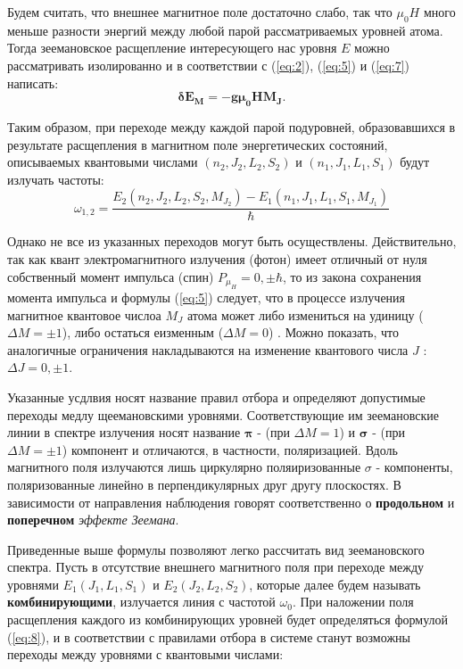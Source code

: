 Будем считать, что внешнее магнитное поле достаточно слабо, так что $\mu_0 H$ много меньше разности энергий между любой парой  рассматриваемых уровней атома. Тогда зеемановское расщепление интересующего нас уровня $E$ можно рассматривать изолированно и в соответствии с (\ref{eq:2}), (\ref{eq:5}) и (\ref{eq:7}) написать: 
\begin{equation}
\mathbf{\delta E_{M} = - g \mu_{0} H M_J}.
\label{eq:8} 
\end{equation}  

Таким образом, при переходе между каждой парой подуровней, образовавшихся в результате расщепления в магнитном поле энергетических состояний, описываемых квантовыми числами $(n_{2},J_{2},L_{2},S_{2})$ и $(n_{1},J_{1},L_{1},S_{1})$  будут излучать частоты: 
\begin{equation}
\omega_{1,2} = \frac{E_{2}(n_{2},J_{2},L_{2},S_{2},M_{J_{2}})-E_{1}(n_{1},J_{1},L_{1},S_{1},M_{J_1})}{\hbar}
\label{eq:9} 
\end{equation}


Однако не все из указанных переходов могут быть осуществлены. Действительно, так как квант электромагнитного излучения (фотон) имеет отличный от нуля собственный момент импульса (спин) $P_{\mu_H} = {0,\pm\hbar}$, то из закона сохранения момента импульса и формулы (\ref{eq:5}) следует, что в процессе излучения магнитное квантовое числоа $M_J$ атома  может либо измениться на удиницу ($\Delta M=\pm 1$),  либо остаться еизменным ($\Delta M = 0$) . Можно показать, что аналогичные ограничения накладываются на изменение квантового числа $J$ : $\Delta J = {0,\pm 1}$.

Указанные усдлвия носят название правил отбора и определяют допустимые переходы медлу щеемановскими уровнями. Соответствующие им зеемановские линии в спектре излучения носят название $\mathbf{\pi}$ - (при $\Delta M = 1$) и $\mathbf{\sigma }$ - (при $\Delta M= \pm 1$)  компонент и отличаются, в частности, поляризацией. Вдоль магнитного поля излучаются лишь циркулярно поляиризованные $\sigma$ - компоненты,  поляризованные линейно в перпендикулярных друг другу плоскостях. В зависимости от направления наблюдения говорят соответственно о \textbf{продольном} и \textbf{поперечном} \textit{эффекте Зеемана}. 

Приведенные выше формулы позволяют легко рассчитать вид зеемановского спектра. Пусть в отсутствие внешнего магнитного поля при переходе между уровнями $E_{1}(J_{1},L_{1},S_{1})$ и $E_{2}(J_{2},L_{2},S_{2})$, которые далее будем называть \textbf{комбинирующими}, излучается линия с частотой $\omega_0$. При наложении поля расщепления каждого из комбинирующих уровней будет определяться формулой (\ref{eq:8}), и в соответствии с правилами отбора в системе станут возможны переходы между уровнями с квантовыми числами: 

